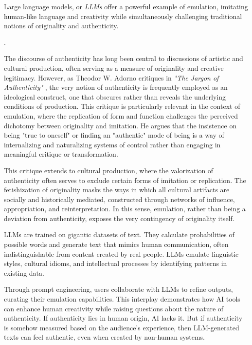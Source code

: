 Large language models, or \textit{LLMs} offer a powerful example of emulation, imitating human-like language and creativity while simultaneously challenging traditional notions of originality and authenticity.


\citep{adorno1973}. 

The discourse of authenticity has long been central to discussions of artistic and cultural production, often serving as a measure of originality and creative legitimacy. However, as Theodor W. Adorno critiques in \textit{"The Jargon of Authenticity"} \citep{adorno1973}, the very notion of authenticity is frequently employed as an ideological construct, one that obscures rather than reveals the underlying conditions of production. This critique is particularly relevant in the context of emulation, where the replication of form and function challenges the perceived dichotomy between originality and imitation. He argues that the insistence on being "true to oneself" or finding an "authentic" mode of being is a way of internalizing and naturalizing systems of control rather than engaging in meaningful critique or transformation.

This critique extends to cultural production, where the valorization of authenticity often serves to exclude certain forms of imitation or replication. The fetishization of originality masks the ways in which all cultural artifacts are socially and historically mediated, constructed through networks of influence, appropriation, and reinterpretation. In this sense, emulation, rather than being a deviation from authenticity, exposes the very contingency of originality itself.


LLMs are trained on gigantic datasets of text. They calculate probabilities of possible words and generate text that mimics human communication, often indistinguishable from content created by real people. LLMs emulate linguistic styles, cultural idioms, and intellectual processes by identifying patterns in existing data. 

Through prompt engineering, users collaborate with LLMs to refine outputs, curating their emulation capabilities. This interplay demonstrates how AI tools can enhance human creativity while raising questions about the nature of authenticity. If authenticity lies in human origin, AI lacks it. But if authenticity is somehow measured based on the audience's experience, then LLM-generated texts can feel authentic, even when created by non-human systems.

